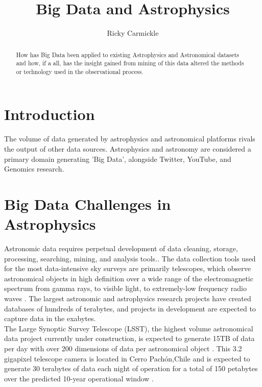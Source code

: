 \documentclass[sigconf]{acmart}
\begin{document}
\title{Big Data and Astrophysics}




\author{Ricky Carmickle}

\maketitle

\begin{abstract}

How has Big Data been applied to existing Astrophysics and Astronomical datasets and how, if a all, has the insight gained from mining of this data altered the methods or technology used in the observational process.

\end{abstract}

\section{Introduction}
The volume of data generated by astrophysics and astronomical platforms rivals the output of other data sources. Astrophysics and astronomy are considered a primary domain generating 'Big Data', alongside Twitter, YouTube, and Genomics research.\cite{Stephens2015} 

\section{Big Data Challenges in Astrophysics}
Astronomic data requires perpetual development of data cleaning, storage, processing, searching, mining, and analysis tools.\cite{Borne2014}. The data collection tools used for the most data-intensive sky surveys are primarily telescopes, which observe astronomical objects in high definition over a wide range of the electromagnetic spectrum from gamma rays, to visible light, to extremely-low frequency radio waves \cite{DR12017}. The largest astronomic and astrophysics research projects have created databases of hundreds of terabytes, and projects in development are expected to capture data in the exabytes\cite{Newman2011,Trader2014,Zhang2015}. \\

The Large Synoptic Survey Telescope (LSST), the highest volume astronomical data project currently under construction, is expected to generate 15TB of data per day with over 200 dimensions of data per astronomical object \cite{LSSTRank}. This 3.2 gigapixel telescope camera is located in Cerro Pachón,Chile and is expected to generate 30 terabytes of data each night of operation for a total of 150 petabytes over the predicted 10-year operational window \cite{EPO}. \\ 
\end{document}

